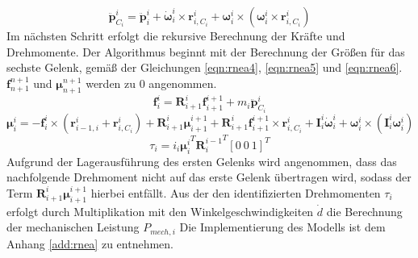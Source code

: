 %
\begin{equation}
	\label{eqn:rnea3}
	\ddot{\bm{p}}^i_{C_i} = \ddot{\bm{p}}^{i}_{i} + \dot{\bm{\omega}}^{i}_{i} \times \bm{r}^{i}_{i,C_i} + {\bm{\omega}}^{i}_{i} \times \left(  {\bm{\omega}}^{i}_{i} \times \bm{r}^{i}_{i,C_i} \right)
\end{equation}
%
Im nächsten Schritt erfolgt die rekursive Berechnung der Kräfte und Drehmomente. Der Algorithmus beginnt mit der Berechnung der Größen für das sechste Gelenk, gemäß der Gleichungen \ref{eqn:rnea4}, \ref{eqn:rnea5} und \ref{eqn:rnea6}. $\bm{f}^{n+1}_{n+1}$ und $\bm{\mu}^{n+1}_{n+1}$ werden zu 0 angenommen. 
%
\begin{equation}
	\label{eqn:rnea4}
	\bm{f}^{i}_{i} = \bm{R}^{i}_{i+1} \bm{f}^{i+1}_{i+1} + m_i\ddot{\bm{p}}^{i}_{C_i}
\end{equation}
%
\begin{equation}
	\label{eqn:rnea5}
	\bm{\mu}^{i}_{i} = -\bm{f}^{i}_{i} \times \left( \bm{r}^{i}_{i-1,i} + \bm{r}^{i}_{i,C_i} \right) + \bm{R}^{i}_{i+1} \bm{\mu}^{i+1}_{i+1} + \bm{R}^{i}_{i+1} \bm{f}^{i+1}_{i+1} \times \bm{r}^{i}_{i,C_i} + \bm{I}^{i}_{i} \dot{\bm{\omega}}^{i}_{i} + {\bm{\omega}}^{i}_{i} \times (\bm{I}^{i}_{i}{\bm{\omega}}^{i}_{i})
\end{equation}
\begin{equation}
	\label{eqn:rnea6}
	\tau_i = i_i{\bm{\mu}^{i}_{i}}^T {\bm{R}^{i-1}_{i}}^T [0~0~1]^T
\end{equation}
%
Aufgrund der Lagerausführung des ersten Gelenks wird angenommen, dass das nachfolgende Drehmoment nicht auf das erste Gelenk übertragen wird, sodass der Term $\bm{R}^{i}_{i+1} \bm{\mu}^{i+1}_{i+1}$ hierbei entfällt. Aus der den identifizierten Drehmomenten $\tau_i$ erfolgt durch Multiplikation mit den Winkelgeschwindigkeiten $\dot{{d}}$ die Berechnung der mechanischen Leistung $P_{mech,i}$ Die Implementierung des Modells ist dem Anhang \ref{add:rnea} zu entnehmen. 
%

